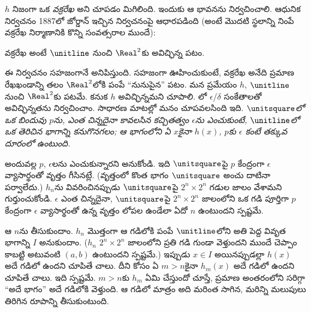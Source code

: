 \documentclass[../../../include/open-logic-section]{subfiles}
\begin{document}
$h$ నిజంగా ఒక \emph{వక్రరేఖ} అని చూపడం మిగిలింది. ఇందుకు ఆ భావనను నిర్వచించాలి. ఆధునిక నిర్వచనం 1887లో జోర్డాన్ ఇచ్చిన నిర్వచనంపై ఆధారపడింది (అంటే మొదటి స్థలాన్ని నింపే వక్రరేఖ నిర్మాణానికి కొన్ని సంవత్సరాల ముందే):

\begin{defn}
వక్రరేఖ అంటే $\unitline$ నుంచి $\Real^2$కు అవిచ్ఛిన్న పటం.
\end{defn}

ఈ నిర్వచనం సహజంగానే అనిపిస్తుంది. సహజంగా ఊహించుకుంటే, వక్రరేఖ అనేది ప్రమాణ రేఖఖండాన్ని తలం $\Real^2$లోకి పంపే ``నునుపైన'' పటం. మన ప్రమేయం $h$, $\unitline$ నుంచి $\Real^2$కు పటమే. కనుక $h$ అవిచ్ఛిన్నమని చూపాలి. లో $\epsilon$/$\delta$ సంకేతాలతో అవిచ్ఛిన్నతను నిర్వచించాం. సాధారణ మాటల్లో మనం చూపవలసింది ఇది. \emph{$\unitsquare$లో ఒక బిందువు $p$ను, ఎంత చిన్నదైనా కావలసిన కచ్చితత్వం $\epsilon$ను ఎంచుకుంటే, $\unitline$లో ఒక తెరిచిన భాగాన్ని కనుగొనగలం; ఆ భాగంలోని ఏ $x$కైనా $h(x)$, $p$కు $\epsilon$ కంటే తక్కువ దూరంలో ఉంటుంది.}
%

అందువల్ల $p$, $\epsilon$లను ఎంచుకున్నారని అనుకోండి. ఇది $\unitsquare$పై $p$ కేంద్రంగా $\epsilon$ వ్యాసార్థంతో వృత్తం గీసినట్లే. (వృత్తంలో కొంత భాగం $\unitsquare$ అంచు దాటినా పర్వాలేదు.) $h_n$ను వివరించినప్పుడు $\unitsquare$పై $2^n \times 2^n$ గడుల జాలం వేశామని గుర్తుంచుకోండి. $\epsilon$ ఎంత చిన్నదైనా, $\unitsquare$పై $2^n \times 2^n$ జాలంలోని ఒక గడి పూర్తిగా $p$ కేంద్రంగా $\epsilon$ వ్యాసార్థంతో ఉన్న వృత్తం లోపల ఉండేలా ఏదో $n$ ఉంటుందని స్పష్టమే.

ఆ $n$ను తీసుకుందాం. $h_n$ మొత్తంగా ఆ గడిలోకి పంపే $\unitline$లోని అతి పెద్ద వివృత భాగాన్ని $I$ అనుకుందాం. ($h_n$ $2^n\times 2^n$ జాలంలోని ప్రతి గడి గుండా వెళ్తుందని ముందే చెప్పాం కాబట్టి అటువంటి $(a,b)$ ఉంటుందని స్పష్టమే.) ఇప్పుడు $x \in I$ అయినప్పుడల్లా $h(x)$ అదే గడిలో ఉందని చూపితే చాలు. దీని కోసం ఏ $m > n$కైనా $h_m(x)$ అదే గడిలో ఉందని చూపితే చాలు. ఇది స్పష్టమే. $m > n$కు $h_m$ ఏమి చేస్తుందో చూస్తే, ప్రమాణ అంతరంలోని సరిగ్గా ``అదే భాగం'' అదే గడిలోకి వెళ్తుంది. ఆ గడిలో మాత్రం అది మరింత సాగిన, మరిన్ని మలుపులు తిరిగిన రూపాన్ని తీసుకుంటుంది.
%
\end{document}
